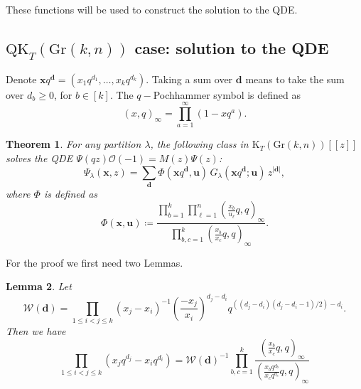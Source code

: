 \documentclass[12pt]{article}
\newtheorem{theorem}{Theorem}[section]
\newtheorem{lemma}[theorem]{Lemma}%
\newcommand{\OC}{\mathcal{O}}
\theoremstyle{plain}
\theoremstyle{definition}
\newcommand{\xb}{\boldsymbol{x}}
\newcommand{\db}{\boldsymbol{d}}
\newcommand{\ub}{\boldsymbol{u}}
\begin{document}
These functions will be used to construct the solution to the QDE. 


\subsection{\texorpdfstring{$\textrm{QK}_T(\textrm{Gr}(k,n))$}{QKT} case: solution to the QDE}


Denote $\xb q^{\boldsymbol{d}}=(x_1 q^{d_1},\dots, {x_k} q^{d_k})$. Taking a sum over $\db$ means to take the sum over $d_b\geq 0$, for $b\in [k]$. The $q-$Pochhammer symbol is defined as
$$
(x,q)_\infty = \prod_{a=1}^\infty (1-xq^a).
$$

\begin{theorem} \label{mainthm}
For any partition $\lambda$, the following class in $\mathrm{K}_T(\mathrm{Gr}(k,n))[[z]]$ solves the QDE $\Psi(qz) \OC(-1)= M(z) \Psi (z)$:
\begin{equation} \label{psiKEQkn}
    \Psi_\lambda(\xb,z)
    =\sum_{\db} \Phi(\xb q^{\boldsymbol{d}}, \ub)\, G_{\lambda} \left( \xb  q^{\boldsymbol{d}}; \ub\right)\, z^{|\boldsymbol{d}|}, 
\end{equation}
where  $\Phi$ is defined as
$$
\Phi(\xb,\ub)\coloneq\frac{\prod\limits_{b=1}^k \prod\limits_
{\ell=1}^n \left(\frac{x_b }{u_\ell}q,q\right)_\infty}{\prod\limits_{b,c=1}^k \left(\frac{x_b }{x_c }q,q\right)_\infty}.
$$
\end{theorem}

For the proof we first need two Lemmas. 
\begin{lemma} \label{pochsplit}
Let $$\mathcal{W}(\boldsymbol{d})= \prod_{1\leq i<j\leq k}  (x_j-x_i)^{-1} \left(\frac{-x_j}{x_i}\right)^{d_j-d_i} q^{{((d_j-d_i)(d_j-d_i-1)/2)}-d_i}.$$
Then we have 
$$\prod_{1\leq i<j\leq k} \left(x_j q^{d_j} - x_i q^{d_i}\right)=\mathcal{W}(\boldsymbol{d})^{-1}\prod_{b,c=1}^k \frac{\left(\frac{x_b}{x_c}q, q \right)_\infty}{\left(\frac{x_bq^{d_b}}{x_cq^{d_c}}q,q\right)_\infty}$$

\end{lemma}
\end{document}
